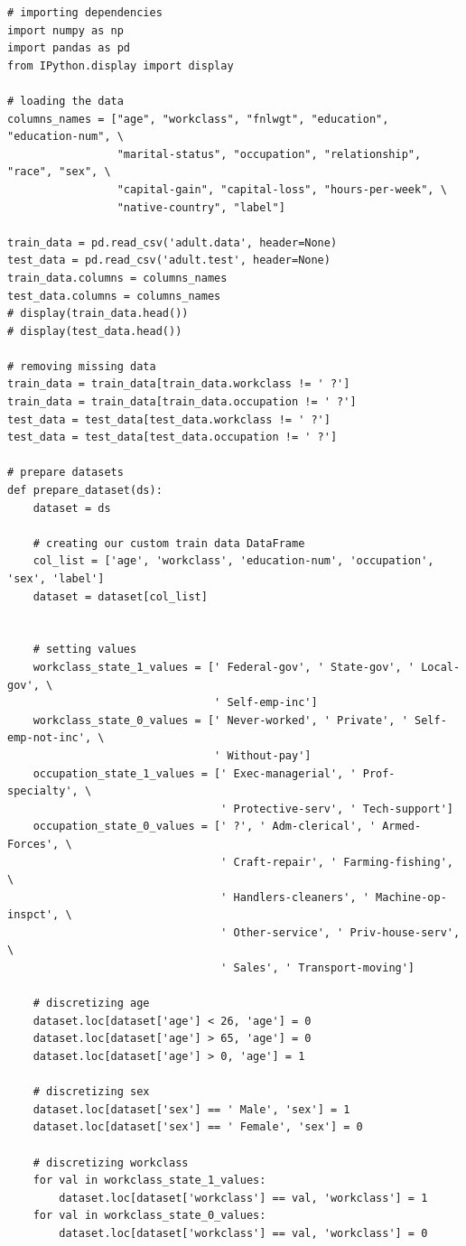 \documentclass{article}
\begin{document}
\begin{verbatim}
# importing dependencies
import numpy as np
import pandas as pd
from IPython.display import display

# loading the data
columns_names = ["age", "workclass", "fnlwgt", "education", "education-num", \
                 "marital-status", "occupation", "relationship", "race", "sex", \
                 "capital-gain", "capital-loss", "hours-per-week", \
                 "native-country", "label"]

train_data = pd.read_csv('adult.data', header=None)
test_data = pd.read_csv('adult.test', header=None)
train_data.columns = columns_names
test_data.columns = columns_names
# display(train_data.head())
# display(test_data.head())

# removing missing data
train_data = train_data[train_data.workclass != ' ?']
train_data = train_data[train_data.occupation != ' ?']
test_data = test_data[test_data.workclass != ' ?']
test_data = test_data[test_data.occupation != ' ?']

# prepare datasets
def prepare_dataset(ds):
    dataset = ds

    # creating our custom train data DataFrame
    col_list = ['age', 'workclass', 'education-num', 'occupation', 'sex', 'label']
    dataset = dataset[col_list]


    # setting values
    workclass_state_1_values = [' Federal-gov', ' State-gov', ' Local-gov', \
                                ' Self-emp-inc']
    workclass_state_0_values = [' Never-worked', ' Private', ' Self-emp-not-inc', \
                                ' Without-pay']
    occupation_state_1_values = [' Exec-managerial', ' Prof-specialty', \
                                 ' Protective-serv', ' Tech-support']
    occupation_state_0_values = [' ?', ' Adm-clerical', ' Armed-Forces', \
                                 ' Craft-repair', ' Farming-fishing', \
                                 ' Handlers-cleaners', ' Machine-op-inspct', \
                                 ' Other-service', ' Priv-house-serv', \
                                 ' Sales', ' Transport-moving'] 

    # discretizing age
    dataset.loc[dataset['age'] < 26, 'age'] = 0
    dataset.loc[dataset['age'] > 65, 'age'] = 0
    dataset.loc[dataset['age'] > 0, 'age'] = 1

    # discretizing sex
    dataset.loc[dataset['sex'] == ' Male', 'sex'] = 1
    dataset.loc[dataset['sex'] == ' Female', 'sex'] = 0

    # discretizing workclass
    for val in workclass_state_1_values:
        dataset.loc[dataset['workclass'] == val, 'workclass'] = 1
    for val in workclass_state_0_values:
        dataset.loc[dataset['workclass'] == val, 'workclass'] = 0


\end{verbatim}
\end{document}
